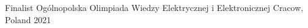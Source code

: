 
\begin{cvhonors}

  \cvhonor
    {Finalist} %
    {Ogólnopolska Olimpiada Wiedzy Elektrycznej i Elektronicznej} %
    {Cracow, Poland} %
    {2021} %

\end{cvhonors}

